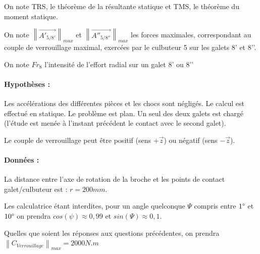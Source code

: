 On note TRS, le théorème de la résultante statique et TMS, le théorème du moment statique.

On note $\left\|\overrightarrow{A'_{5/8'}}\right\|_{max}$ et $\left\|\overrightarrow{A''_{5/8''}}\right\|_{max}$ les forces maximales, correspondant au couple de verrouillage maximal, exercées par le culbuteur 5 sur les galets 8’ et 8’’.

On note $Fr_8$ l’intensité de l’effort radial sur un galet 8’ ou 8’’

\paragraph{Hypothèses :}

Les accélérations des différentes pièces et les chocs sont négligés. Le calcul est effectué en statique. Le problème est plan. Un seul des deux galets est chargé (l’étude est menée à l’instant précédent le contact avec le second galet).


Le couple de verrouillage peut être positif (sens $+\vec{z}$) ou négatif (sens $-\vec{z}$).


\paragraph{Données :}

La distance entre l’axe de rotation de la broche et les points de contact galet/culbuteur est : $r = 200mm$.

Les calculatrice étant interdites, pour un angle quelconque $\Psi$ compris entre $1\degree$ et $10\degree$ on prendra $cos(\psi) \approx 0,99$ et $sin(\Psi)\approx 0,1$.

Quelles que soient les réponses aux questions précédentes, on prendra
$\left\|C_{Verrouillage}\right\|_{max}=2000 N.m$


